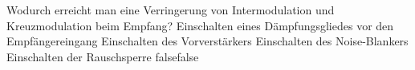     {Wodurch erreicht man eine Verringerung von Intermodulation und Kreuzmodulation beim Empfang?}
    {Einschalten eines Dämpfungsgliedes vor den Empfängereingang}
    {Einschalten des Vorverstärkers}
    {Einschalten des Noise-Blankers}
    {Einschalten der Rauschsperre}
    {false}{false}